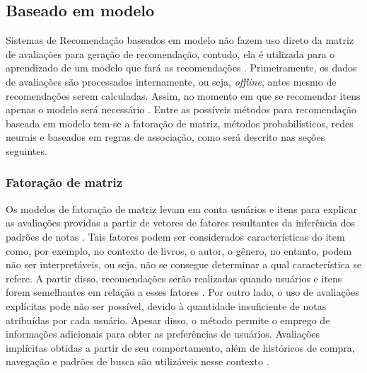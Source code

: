    
    \subsection{Baseado em modelo}

        Sistemas de Recomendação baseados em modelo  não fazem uso direto da matriz de avaliações para geração de recomendação, contudo, ela é utilizada para o aprendizado de um modelo que fará as recomendações \cite{Adomavicius2005}. Primeiramente, os dados de avaliações são processados internamente, ou seja, \textit{offline}, antes mesmo de  recomendações serem calculadas. Assim, no momento em que se recomendar itens apenas o modelo será necessário \cite{Jannach2010}. Entre as possíveis métodos para recomendação baseada em modelo tem-se a fatoração de matriz, métodos probabilísticos, redes neurais e baseados em regras de associação, como será descrito nas seções seguintes. 
        
        \subsubsection{Fatoração de matriz}
        
        Os modelos de fatoração de matriz levam em conta usuários e itens para explicar as avaliações providas a partir de vetores de fatores resultantes da inferência dos padrões de notas \cite{Koren2009}. Tais fatores podem ser considerados características do item como, por exemplo, no contexto de livros, o autor, o gênero, no entanto, podem não ser interpretáveis, ou seja, não se consegue determinar a qual característica se refere. A partir disso, recomendações serão realizadas quando usuários e itens forem semelhantes em relação a esses fatores \cite{Jannach2010}. Por outro lado, o uso de avaliações explícitas pode não ser possível, devido à quantidade insuficiente de notas atribuídas por cada usuário. Apesar disso, o método permite o emprego de informações adicionais para obter as preferências de usuários. Avaliações implícitas obtidas a partir de seu comportamento, além de históricos de compra, navegação e padrões de busca são utilizáveis nesse contexto \cite{Koren2009}. 
        
        
        
